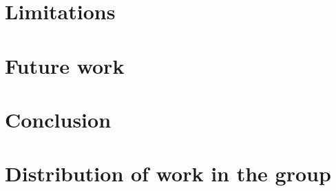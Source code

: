\documentclass{article}
\begin{document}
\section*{Limitations}

\section*{Future work}

\section*{Conclusion}

\section*{Distribution of work in the group}
\end{document}
